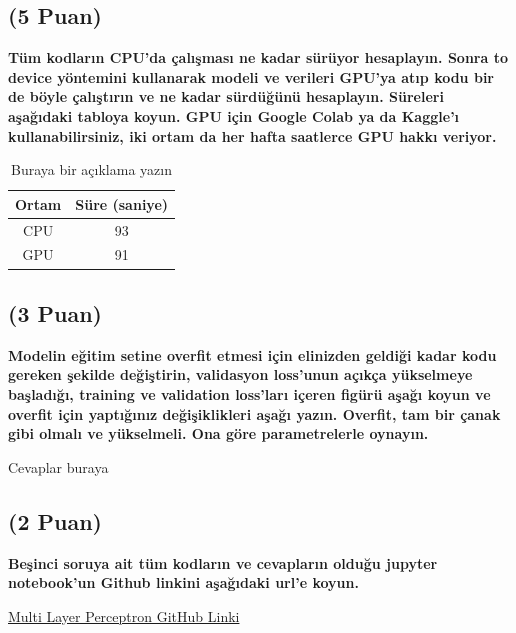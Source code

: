 \documentclass[11pt]{article}
\begin{document}
\subsection{(5 Puan)} \textbf{Tüm kodların CPU'da çalışması ne kadar sürüyor hesaplayın. Sonra to device yöntemini kullanarak modeli ve verileri GPU'ya atıp kodu bir de böyle çalıştırın ve ne kadar sürdüğünü hesaplayın. Süreleri aşağıdaki tabloya koyun. GPU için Google Colab ya da Kaggle'ı kullanabilirsiniz, iki ortam da her hafta saatlerce GPU hakkı veriyor.}

\begin{table}[ht!]
    \centering
    \caption{Buraya bir açıklama yazın}
    \begin{tabular}{c|c}
        Ortam & Süre (saniye) \\\hline
        CPU & 93 \\
        GPU & 91\\
    \end{tabular}
    \label{tab:my_table}
\end{table}

\subsection{(3 Puan)} \textbf{Modelin eğitim setine overfit etmesi için elinizden geldiği kadar kodu gereken şekilde değiştirin, validasyon loss'unun açıkça yükselmeye başladığı, training ve validation loss'ları içeren figürü aşağı koyun ve overfit için yaptığınız değişiklikleri aşağı yazın. Overfit, tam bir çanak gibi olmalı ve yükselmeli. Ona göre parametrelerle oynayın.}

Cevaplar buraya

\subsection{(2 Puan)} \textbf{Beşinci soruya ait tüm kodların ve cevapların olduğu jupyter notebook'un Github linkini aşağıdaki url'e koyun.}

\href{https://github.com/ilkay-bicici/yapaysiniraglariornekler/blob/83e7c9b6202ea32adf1ece1eeadc6e4ed62ac409/curetheprincess.ipynb}{Multi Layer Perceptron GitHub Linki}
\end{document}
